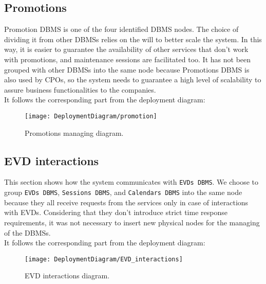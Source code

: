 \subsection{Promotions}
\label{subsec:promotions}%
Promotion DBMS is one of the four identified DBMS nodes.
The choice of dividing it from other DBMSs relies on the will to better scale the system.
In this way, it is easier to guarantee the availability of other services that don't work with promotions,
and maintenance sessions are facilitated too.
It has not been grouped with other DBMSs into the same node because Promotions DBMS is also used by CPOs,
so the system needs to guarantee a high level of scalability to assure business functionalities to the companies. \\
It follows the corresponding part from the deployment diagram:
\begin{figure} [H]
    \begin{center}
        \texttt{[image: DeploymentDiagram/promotion]}
        \caption{Promotions managing diagram.}
        \label{fig: promotion}
    \end{center}
\end{figure}

\subsection{EVD interactions}
\label{subsec:evd_interactions}%
This section shows how the system communicates with \verb|EVDs DBMS|\@.
We choose to group \verb|EVDs DBMS|, \verb|Sessions DBMS|, and \verb|Calendars DBMS| into the same node because
they all receive requests from the services only in case of interactions with EVDs.
Considering that they don't introduce strict time response requirements,
it was not necessary to insert new physical nodes for the managing of the DBMSs. \\
It follows the corresponding part from the deployment diagram:
\begin{figure} [H]
    \begin{center}
        \texttt{[image: DeploymentDiagram/EVD\_interactions]}
        \caption{EVD interactions diagram.}
        \label{fig: evd_interactions}
    \end{center}
\end{figure}

